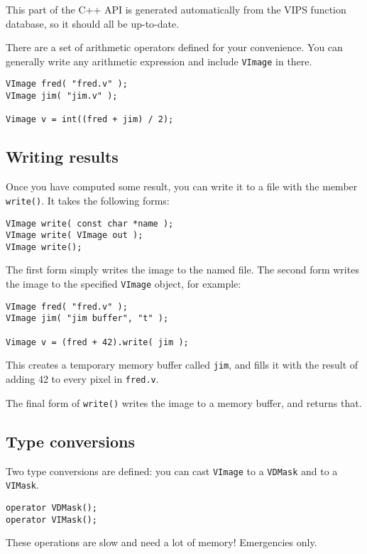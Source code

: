 This part of the C++ API is generated automatically from the VIPS function
database, so it should all be up-to-date.

There are a set of arithmetic operators defined for your convenience. You can
generally write any arithmetic expression and include \verb+VImage+ in there.

\begin{verbatim}
VImage fred( "fred.v" );
VImage jim( "jim.v" );

Vimage v = int((fred + jim) / 2);
\end{verbatim}

\subsection{Writing results}

Once you have computed some result, you can write it to a file with the member
\verb+write()+. It takes the following forms:

\begin{verbatim}
VImage write( const char *name );
VImage write( VImage out );
VImage write();
\end{verbatim}

The first form simply writes the image to the named file. The second form
writes the image to the specified \verb+VImage+ object, for example:

\begin{verbatim}
VImage fred( "fred.v" );
VImage jim( "jim buffer", "t" );

Vimage v = (fred + 42).write( jim );
\end{verbatim}

\noindent
This creates a temporary memory buffer called \verb+jim+, and fills it with
the result of adding 42 to every pixel in \verb+fred.v+.

The final form of \verb+write()+ writes the image to a memory buffer, and
returns that.

\subsection{Type conversions}

Two type conversions are defined: you can cast \verb+VImage+ to a
\verb+VDMask+ and to a \verb+VIMask+.

\begin{verbatim}
operator VDMask();
operator VIMask();
\end{verbatim}

These operations are slow and need a lot of memory! Emergencies only.
